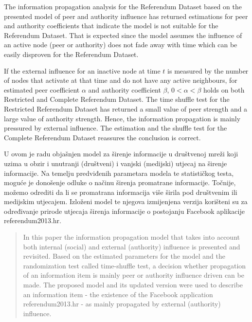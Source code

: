 \documentclass[times, utf8, zavrsni]{fer}
\begin{document}
The information propagation analysis for the Referendum Dataset based on the presented model of peer and authority influence has returned estimations for peer and authority coefficients that indicate the model is not suitable for the Referendum Dataset. That is expected since the model assumes the influence of an active node (peer or authority) does not fade away with time which can be easily disproven for the Referendum Dataset.

If the external influence for an inactive node at time $t$ is measured by the number of nodes that activate at that  time and do not have any active neighbours, for estimated peer coefficient $\alpha$ and authority coefficient $\beta$, $0 < \alpha < \beta$ holds on both Restricted and Complete Referendum Dataset. The time shuffle test for the Restricted Referendum Dataset has returned a small value of peer strength and a large value of authority strength. Hence, the information propagation is mainly pressured by external influence. The estimation and the shuffle test for the Complete Referendum Dataset reassures the conclusion is correct. 



\pagebreak
\begin{sazetak}
U ovom je radu objašnjen model za širenje informacije  u društvenoj mreži koji uzima u obzir i unutranji (društveni) i vanjski (medijski) utjecaj na širenje informacije. Na temelju predviđenih parametara modela te statističkog testa, moguće je donošenje odluke o načinu širenja promatrane informacije. Točnije, možemo odrediti da li se promatrana informacija više širila pod društvenim ili medijskim utjecajem. Izloženi model te njegova izmijenjena verzija korišteni su za određivanje prirode utjecaja širenja informacije o postojanju Facebook aplikacije referendum2013.hr. 

\end{sazetak}

\begin{abstract}
In this paper the information propagation model that takes into account both internal (social) and external (authority) influence is presented and revisited. Based on the estimated parameters for the model and the randomization test called time-shuffle test, a decision whether propagation of an information item is mainly peer or authority influence driven can be made. The proposed model and its updated version were used to describe an information item - the existence of the Facebook application referendum2013.hr - as mainly propagated by external (authority) influence. 

\end{abstract}
\end{document}
